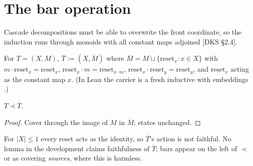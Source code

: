 \chapter{The bar operation}\label{ch:bar}

Cascade decompositions must be able to overwrite the front coordinate,
so the induction runs through monoids with all constant maps adjoined
[DKS §2.4].

\begin{definition}[Bar]\label{def:bar}
  \leanok
  For $T = (X, M)$, $\overline{T} := (X, \overline{M})$ where
  $\overline{M} = M \sqcup \{\mathrm{reset}_x : x \in X\}$ with
  $m \cdot \mathrm{reset}_x = \mathrm{reset}_x$,
  $\mathrm{reset}_x \cdot m = \mathrm{reset}_{x \cdot m}$,
  $\mathrm{reset}_x \cdot \mathrm{reset}_y = \mathrm{reset}_y$, and
  $\mathrm{reset}_x$ acting as the constant map $x$.
  (In Lean the carrier is a fresh inductive with embeddings
  .)
\end{definition}

\begin{lemma}\label{lem:bar-divides}
  \leanok{}
  $T \prec \overline{T}$.
\end{lemma}
\begin{proof}
  \leanok
  Cover through the image of $M$ in $\overline{M}$; states unchanged.
\end{proof}

\begin{remark}\label{rem:bar-degenerate}
  For $|X| \le 1$ every reset acts as the identity, so
  $\overline{T}$'s action is not faithful. No lemma in the development
  claims faithfulness of $\overline{T}$; bars appear on the left of
  $\prec$ or as covering \emph{sources}, where this is harmless.
\end{remark}

